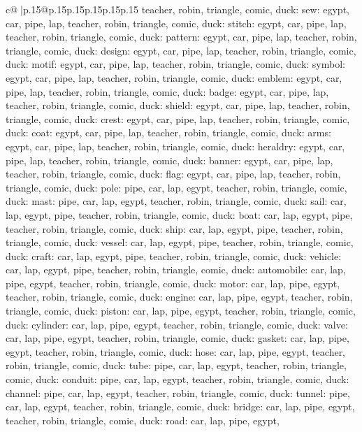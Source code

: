 \documentclass{article}
\begin{document}
{\begin{supertabular}{c@{$\;$}|p{.15\linewidth}@{}p{.15\linewidth}p{.15\linewidth}p{.15\linewidth}p{.15\linewidth}p{.15\linewidth}}
{{{teacher, robin, triangle, comic, duck\n\nCLUE: sew\nTARGETS: egypt, car, pipe, lap, teacher, robin, triangle, comic, duck\n\nCLUE: stitch\nTARGETS: egypt, car, pipe, lap, teacher, robin, triangle, comic, duck\n\nCLUE: pattern\nTARGETS: egypt, car, pipe, lap, teacher, robin, triangle, comic, duck\n\nCLUE: design\nTARGETS: egypt, car, pipe, lap, teacher, robin, triangle, comic, duck\n\nCLUE: motif\nTARGETS: egypt, car, pipe, lap, teacher, robin, triangle, comic, duck\n\nCLUE: symbol\nTARGETS: egypt, car, pipe, lap, teacher, robin, triangle, comic, duck\n\nCLUE: emblem\nTARGETS: egypt, car, pipe, lap, teacher, robin, triangle, comic, duck\n\nCLUE: badge\nTARGETS: egypt, car, pipe, lap, teacher, robin, triangle, comic, duck\n\nCLUE: shield\nTARGETS: egypt, car, pipe, lap, teacher, robin, triangle, comic, duck\n\nCLUE: crest\nTARGETS: egypt, car, pipe, lap, teacher, robin, triangle, comic, duck\n\nCLUE: coat\nTARGETS: egypt, car, pipe, lap, teacher, robin, triangle, comic, duck\n\nCLUE: arms\nTARGETS: egypt, car, pipe, lap, teacher, robin, triangle, comic, duck\n\nCLUE: heraldry\nTARGETS: egypt, car, pipe, lap, teacher, robin, triangle, comic, duck\n\nCLUE: banner\nTARGETS: egypt, car, pipe, lap, teacher, robin, triangle, comic, duck\n\nCLUE: flag\nTARGETS: egypt, car, pipe, lap, teacher, robin, triangle, comic, duck\n\nCLUE: pole\nTARGETS: pipe, car, lap, egypt, teacher, robin, triangle, comic, duck\n\nCLUE: mast\nTARGETS: pipe, car, lap, egypt, teacher, robin, triangle, comic, duck\n\nCLUE: sail\nTARGETS: car, lap, egypt, pipe, teacher, robin, triangle, comic, duck\n\nCLUE: boat\nTARGETS: car, lap, egypt, pipe, teacher, robin, triangle, comic, duck\n\nCLUE: ship\nTARGETS: car, lap, egypt, pipe, teacher, robin, triangle, comic, duck\n\nCLUE: vessel\nTARGETS: car, lap, egypt, pipe, teacher, robin, triangle, comic, duck\n\nCLUE: craft\nTARGETS: car, lap, egypt, pipe, teacher, robin, triangle, comic, duck\n\nCLUE: vehicle\nTARGETS: car, lap, egypt, pipe, teacher, robin, triangle, comic, duck\n\nCLUE: automobile\nTARGETS: car, lap, pipe, egypt, teacher, robin, triangle, comic, duck\n\nCLUE: motor\nTARGETS: car, lap, pipe, egypt, teacher, robin, triangle, comic, duck\n\nCLUE: engine\nTARGETS: car, lap, pipe, egypt, teacher, robin, triangle, comic, duck\n\nCLUE: piston\nTARGETS: car, lap, pipe, egypt, teacher, robin, triangle, comic, duck\n\nCLUE: cylinder\nTARGETS: car, lap, pipe, egypt, teacher, robin, triangle, comic, duck\n\nCLUE: valve\nTARGETS: car, lap, pipe, egypt, teacher, robin, triangle, comic, duck\n\nCLUE: gasket\nTARGETS: car, lap, pipe, egypt, teacher, robin, triangle, comic, duck\n\nCLUE: hose\nTARGETS: car, lap, pipe, egypt, teacher, robin, triangle, comic, duck\n\nCLUE: tube\nTARGETS: pipe, car, lap, egypt, teacher, robin, triangle, comic, duck\n\nCLUE: conduit\nTARGETS: pipe, car, lap, egypt, teacher, robin, triangle, comic, duck\n\nCLUE: channel\nTARGETS: pipe, car, lap, egypt, teacher, robin, triangle, comic, duck\n\nCLUE: tunnel\nTARGETS: pipe, car, lap, egypt, teacher, robin, triangle, comic, duck\n\nCLUE: bridge\nTARGETS: car, lap, pipe, egypt, teacher, robin, triangle, comic, duck\n\nCLUE: road\nTARGETS: car, lap, pipe, egypt, }}}
\end{supertabular}}
\end{document}

